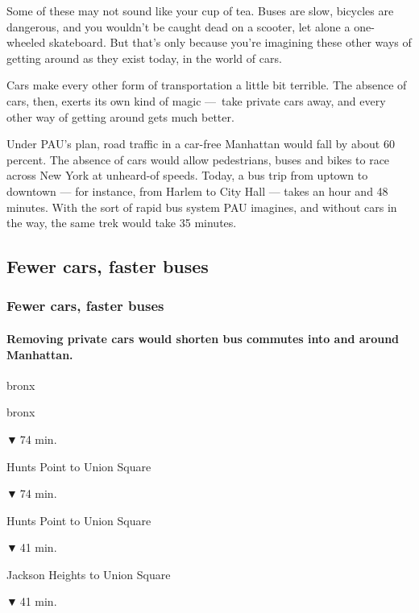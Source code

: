 Some of these may not sound like your cup of tea. Buses are slow,
bicycles are dangerous, and you wouldn't be caught dead on a scooter,
let alone a one-wheeled skateboard. But that's only because you're
imagining these other ways of getting around as they exist today, in the
world of cars.

Cars make every other form of transportation a little bit terrible. The
absence of cars, then, exerts its own kind of magic ---~take private
cars away, and every other way of getting around gets much better.

Under PAU's plan, road traffic in a car-free Manhattan would fall by
about 60 percent. The absence of cars would allow pedestrians, buses and
bikes to race across New York at unheard-of speeds. Today, a bus trip
from uptown to downtown --- for instance, from Harlem to City Hall ---
takes an hour and 48 minutes. With the sort of rapid bus system PAU
imagines, and without cars in the way, the same trek would take 35
minutes.

\hypertarget{fewer-cars-faster-buses}{%
\subsection{Fewer cars, faster buses}\label{fewer-cars-faster-buses}}

\hypertarget{fewer-cars-faster-buses-1}{%
\subsubsection{Fewer cars, faster
buses}\label{fewer-cars-faster-buses-1}}

\hypertarget{removing-private-cars-would-shorten-bus-commutes-into-and-around-manhattan}{%
\paragraph{Removing private cars would shorten bus commutes into and
around
Manhattan.}\label{removing-private-cars-would-shorten-bus-commutes-into-and-around-manhattan}}

bronx

bronx

▼ 74 min.

Hunts Point to Union Square

▼ 74 min.

Hunts Point to Union Square

▼ 41 min.

Jackson Heights to Union Square

▼ 41 min.

